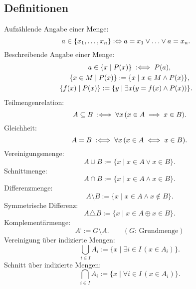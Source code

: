 \subsection{Definitionen}
Aufzählende Angabe einer Menge:
\begin{equation}
\hspace{-1em} a\in\{x_1,\ldots,x_n\} :\Leftrightarrow a=x_1\lor\ldots\lor a=x_n.
\end{equation}
Beschreibende Angabe einer Menge:
\begin{gather}
a\in\{x\mid P(x)\}\;:\Longleftrightarrow\; P(a),\\
\{x\in M\mid P(x)\} := \{x\mid x\in M\land P(x)\},\\
\hspace{-1em}\{f(x)\mid P(x)\} := \{y\mid \exists x(y=f(x)\land P(x))\}.
\end{gather}
Teilmengenrelation:
\begin{equation}
A\subseteq B\;:\Longleftrightarrow\; \forall x\,(x\in A\implies x\in B).
\end{equation}
Gleichheit:
\begin{equation}
A=B\;:\Longleftrightarrow\; \forall x\,(x\in A\iff x\in B).
\end{equation}
Vereinigungsmenge:
\begin{equation}
A\cup B:=\{x\mid x\in A\lor x\in B\}.
\end{equation}
Schnittmenge:
\begin{equation}
A\cap B:=\{x\mid x\in A\land x\in B\}.
\end{equation}
Differenzmenge:
\begin{equation}
A\setminus B:=\{x\mid x\in A\land x\not\in B\}.
\end{equation}
Symmetrische Differenz:
\begin{equation}
A\triangle B:=\{x\mid x\in A\oplus x\in B\}.
\end{equation}
Komplementärmenge:
\begin{equation}
A^\comp := G\setminus A.\qquad (\text{$G$: Grundmenge})
\end{equation}
Vereinigung über indizierte Mengen:
\begin{equation}
\bigcup_{i\in I} A_i := \{x\mid\exists i{\in}I\,(x\in A_i)\}.
\end{equation}
Schnitt über indizierte Mengen:
\begin{equation}
\bigcap_{i\in I} A_i := \{x\mid\forall i{\in}I\,(x\in A_i)\}.
\end{equation}


